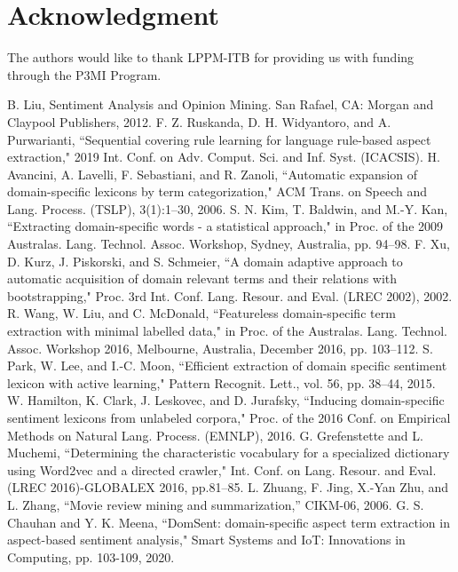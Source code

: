 \documentclass[a4paper,conference]{IEEEtran}
\begin{document}
\section*{Acknowledgment}

The authors would like to thank LPPM-ITB for providing us with funding through the P3MI Program.

\begin{thebibliography}{00}
 B. Liu, Sentiment Analysis and Opinion Mining. San Rafael, CA: Morgan and Claypool Publishers, 2012.
 F. Z. Ruskanda, D. H. Widyantoro, and A. Purwarianti, ``Sequential covering rule learning for language rule-based aspect extraction," 2019 Int. Conf. on Adv. Comput. Sci. and Inf. Syst. (ICACSIS).
 H. Avancini, A. Lavelli, F. Sebastiani, and R. Zanoli, ``Automatic expansion of domain-specific lexicons by term categorization," ACM Trans. on Speech and Lang. Process. (TSLP), 3(1):1–30, 2006.
 S. N. Kim, T. Baldwin, and M.-Y. Kan, ``Extracting domain-specific words - a statistical approach," in Proc. of the 2009 Australas. Lang. Technol. Assoc. Workshop, Sydney, Australia, pp. 94–98.
 F. Xu, D. Kurz, J. Piskorski, and S. Schmeier, ``A domain adaptive approach to automatic acquisition of domain relevant terms and their relations with bootstrapping," Proc. 3rd Int. Conf. Lang. Resour. and Eval. (LREC 2002), 2002.
 R. Wang, W. Liu, and C. McDonald, ``Featureless domain-specific term extraction with minimal labelled data," in Proc. of the Australas. Lang. Technol. Assoc. Workshop 2016, Melbourne, Australia, December 2016, pp. 103–112.
 S. Park, W. Lee, and I.-C. Moon, ``Efficient extraction of domain specific sentiment lexicon with active learning," Pattern Recognit. Lett., vol. 56, pp. 38–44, 2015.
 W. Hamilton, K. Clark, J. Leskovec, and D. Jurafsky, ``Inducing domain-specific sentiment lexicons from unlabeled corpora," Proc. of the 2016 Conf. on Empirical Methods on Natural Lang. Process. (EMNLP), 2016.
 G. Grefenstette and L. Muchemi, ``Determining the characteristic vocabulary for a specialized dictionary using Word2vec and a directed crawler," Int. Conf. on Lang. Resour. and Eval. (LREC 2016)-GLOBALEX 2016, pp.81–85.
 L. Zhuang, F. Jing, X.-Yan Zhu, and L. Zhang, “Movie review mining and summarization,” CIKM-06, 2006.
 G. S. Chauhan and Y. K. Meena, ``DomSent: domain-specific aspect term extraction in aspect-based sentiment analysis," Smart Systems and IoT: Innovations in Computing, pp. 103-109, 2020.

\end{thebibliography}
\end{document}
